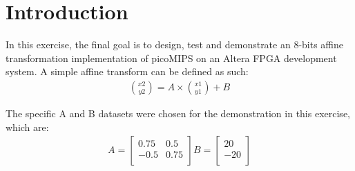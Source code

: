 

\section{Introduction} \label{Section:Introduction}
In this exercise, the final goal is to design, test and demonstrate an 8-bits affine transformation implementation of picoMIPS on an Altera FPGA development system. A simple affine transform\cite{affine} can be defined as such: 
\begin{align}
	{x2 \choose y2} = A \times {x1 \choose y1} + B
\end{align}

The specific A and B datasets were chosen for the demonstration in this exercise, which are:
\begin{align}
 A = \begin{bmatrix}
       0.75 & 0.5           \\[0.3em]
       -0.5 & 0.75          \\[0.3em]
     \end{bmatrix}   		
 B= \begin{bmatrix}
        20          \\[0.3em]
       -20          \\[0.3em]
     \end{bmatrix}
\end{align}

